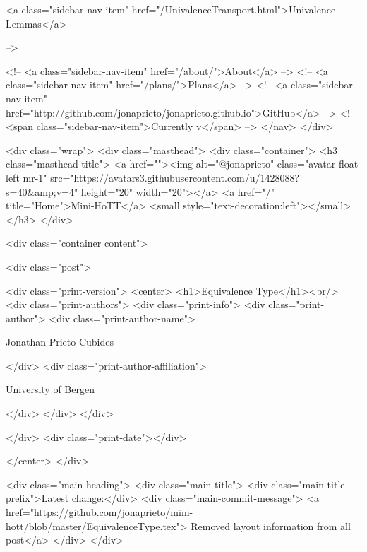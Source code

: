       
    
      
        
          <a class="sidebar-nav-item" href="/UnivalenceTransport.html">Univalence Lemmas</a>
        
      
     -->

    <!-- <a class="sidebar-nav-item" href="/about/">About</a> -->
    <!-- <a class="sidebar-nav-item" href="/plans/">Plans</a> -->
    <!-- <a class="sidebar-nav-item" href="http://github.com/jonaprieto/jonaprieto.github.io">GitHub</a> -->
    <!-- <span class="sidebar-nav-item">Currently v</span> -->
  </nav>
</div>

    <div class="wrap">
      <div class="masthead">
        <div class="container">
          <h3 class="masthead-title">
            <a href=""><img alt="@jonaprieto" class="avatar float-left mr-1" src="https://avatars3.githubusercontent.com/u/1428088?s=40&amp;v=4" height="20" width="20"></a>
            <a href="/" title="Home">Mini-HoTT</a>
            <small style="text-decoration:left"></small>
          </h3>
        </div>
      
      <div class="container content">
        







<div class="post">

  <div class="print-version">
    <center>
      <h1>Equivalence Type</h1><br/>
        <div class="print-authors">
          <div class="print-info">
            <div class="print-author">
              <div class="print-author-name">
                
                  Jonathan Prieto-Cubides
                
              </div>
              <div class="print-author-affiliation">
                
                  University of Bergen
                
                </div>
            </div>
          </div>
          
          
        </div>
        <div class="print-date"></div>
        
        
    </center>
  </div>

  
  <div class="main-heading">
    <div class="main-title">
      <div class="main-title-prefix">Latest change:</div>
      <div class="main-commit-message">
            <a href="https://github.com/jonaprieto/mini-hott/blob/master/EquivalenceType.tex">
              Removed layout information from all post</a>
      </div>
    </div>

